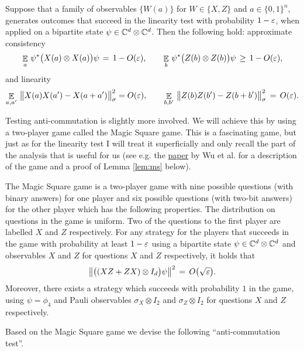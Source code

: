 \begin{lemma}\label{lem:com}
Suppose that a family of observables $\{W(a)\}$ for $W\in\{X,Z\}$ and $a\in\{0,1\}^n$, generates outcomes that succeed in the linearity test with probability $1-\varepsilon$, when applied on a bipartite state $\psi\in\mathbb{C}^d\otimes \mathbb{C}^d$. Then the following hold: approximate consistency
$$ \mathop{\mathbb{E}}\displaylimits_a \, \psi^* \big(X(a) \otimes X(a)\big) \psi \,=\,1-O(\varepsilon),\qquad \mathop{\mathbb{E}}\displaylimits_b \, \psi^* \big(Z(b) \otimes Z(b) \big)\psi\,\geq\,1-O(\varepsilon),$$ 
and linearity 
$$
 \mathop{\mathbb{E}}\displaylimits_{a,a'} \,\big\|X(a)X(a')-X(a+a')\big\|_\sigma^2 = O(\varepsilon),\qquad\mathop{\mathbb{E}}\displaylimits_{b,b'}\, \big\|Z(b)Z(b')-Z(b+b')\big\|_\sigma^2  \,=\, O({\varepsilon}).$$
\end{lemma}

Testing anti-commutation is slightly more involved. We will achieve this by using a two-player game called the Magic Square game. This is a fascinating game, but just as for the linearity test I will treat it superficially and only recall the part of the analysis that is useful for us (see e.g. the \href{https://arxiv.org/abs/1512.02074}{paper} by Wu et al. for a description of the game and a proof of Lemma \ref{lem:ms} below). 

\begin{lemma}\label{lem:ms}
The Magic Square game is a two-player game with nine possible questions (with binary answers) for one player and six possible questions (with two-bit answers) for the other player which has the following properties. The distribution on questions in the game is uniform. Two of the questions to the first player are labelled $X$ and $Z$ respectively. For any strategy for the players that succeeds in the game with probability at least $1-\varepsilon$ using  a bipartite state $\psi\in\mathbb{C}^d\otimes \mathbb{C}^d$ and observables $X$ and $Z$ for questions $X$ and $Z$ respectively, it holds that 
\begin{equation}\label{eq:ms-ac}
\big\|\big( (XZ+ZX)\otimes I_d \big)\psi\big\|^2 \,=\, O\big(\sqrt{\varepsilon}\big).
\end{equation}
Moreover, there exists a strategy which succeeds with probability $1$ in the game, using $\psi=\phi_4$ and Pauli observables $\sigma_X \otimes I_2$ and $\sigma_Z\otimes I_2$  for questions $X$ and $Z$ respectively. 
\end{lemma}

Based on the Magic Square game we devise the following ``anti-commutation test''. 

